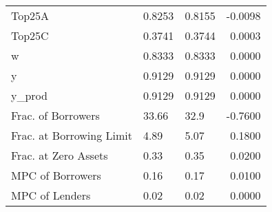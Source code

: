 \begin{table}
\begin{tabular}{lllr}
                  Top25A &  0.8253 &   0.8155 & -0.0098 \\
                  Top25C &  0.3741 &   0.3744 &  0.0003 \\
                       w &  0.8333 &   0.8333 &  0.0000 \\
                       y &  0.9129 &   0.9129 &  0.0000 \\
                  y\_prod &  0.9129 &   0.9129 &  0.0000 \\
      Frac. of Borrowers &   33.66 &     32.9 & -0.7600 \\
Frac. at Borrowing Limit &    4.89 &     5.07 &  0.1800 \\
    Frac. at Zero Assets &    0.33 &     0.35 &  0.0200 \\
        MPC of Borrowers &    0.16 &     0.17 &  0.0100 \\
          MPC of Lenders &    0.02 &     0.02 &  0.0000 \\
\bottomrule
\end{tabular}
\end{table}
